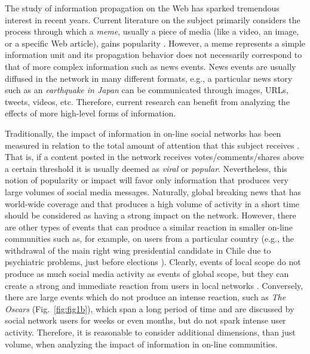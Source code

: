 \documentclass[10pt,letterpaper]{article}
\begin{document}

The study of information propagation on the Web has sparked tremendous
interest in recent years. Current literature on the subject primarily
considers the process through which a {\em meme}, usually a piece of
media (like a video, an image, or a specific Web article), gains
popularity
\cite{Castillo:2014,Szabo:2010,Lerman:2010,Tatar2014,Pinto:2013,Ahmed:2013,Li:2016:concept:drift,
Liu:2015:UN}.  
However, a meme represents a
simple information unit and its propagation behavior does not necessarily
correspond to that of more complex information such as
news events. News events are usually diffused in the network in many
different formats, e.g., a particular news story such as an {\em
  earthquake in Japan} can be communicated through images, URLs,
tweets, videos, etc. Therefore, current research can benefit from analyzing
the effects of more high-level forms of information. 

Traditionally, the impact of information in on-line social networks has been
measured in relation to the total amount of attention that this subject receives
\cite{berger2012makes,iribarren2011branching,guerini2011exploring,mills2012virality,gaugaz2012predicting}.
That is, if a content posted in the network receives
votes/comments/shares above a certain threshold it is usually deemed as {\em viral} or
{\em popular}. Nevertheless, this
notion of popularity or impact will favor only information that produces very large
volumes of social media messages. 
Naturally, global breaking news that has world-wide coverage and that produces a high volume of
activity in a short time should be considered as
having a strong impact on the network.  However, there are other types of events
that can produce a similar reaction in smaller on-line communities
such as, for example, on users from a particular country
(e.g., the
withdrawal of the main right wing presidential candidate in Chile due
to psychiatric problems, just before
elections \cite{chile_elections}).
Clearly, events of local scope do not produce as much social media
activity as events of global scope, but they can create a strong and
immediate reaction from users in local networks \cite{ReisBOPKA15}. Conversely,
there are large events which do not produce an intense reaction, such as
{\em The Oscars} (Fig.~\ref{fig:fig1b}), which span a long
period of time and are discussed by social network users for weeks or
even months, but do not spark intense user activity. Therefore, it is reasonable to consider additional dimensions,
than just volume, when analyzing the impact of information in on-line communities.  
\end{document}
